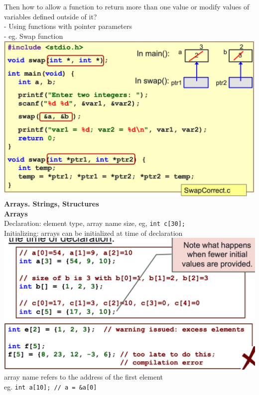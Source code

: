 \documentclass[10pt, a4paper]{article}
\begin{document}
\begin{multicols*}{3}
		Then how to allow a function to return more than one value or modify values of variables defined outside of it?\\
		- Using functions with pointer parameters\\		
		- eg. Swap function\\
		\includegraphics[scale=0.25]{./assets/swapFunction}\\
		
		{\normalsize\textbf{Arrays. Strings, Structures}}\\
		\textbf{Arrays}\\
		Declaration: element type, array name size, eg, \texttt{int c[30];}\\
		Initializing: arrays can be initialized at time of declaration\\
		\includegraphics[scale=0.25]{./assets/array}\\
		\includegraphics[scale=0.25]{./assets/array2}\\
		array name refers to the address of the first element \\
		eg. \texttt{int a[10]; // a = \&a[0]}\\
		

\end{multicols*}
\end{document}
